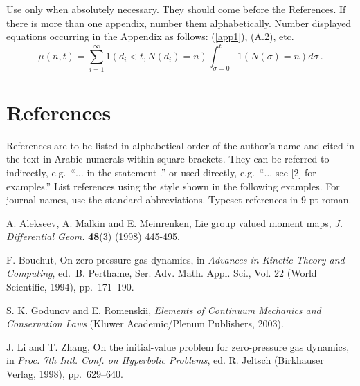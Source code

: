 \documentclass{ws-ijnt}
\begin{document}
Use only when absolutely necessary. They
should come before the References. If there is more than one 
appendix, number them alphabetically. Number displayed equations
occurring in the Appendix as follows: (\ref{app1}), (A.2),
etc.
\begin{equation}
\mu(n, t) = {\sum^\infty_{i=1} 1(d_i < t, N(d_i) 
= n)}{\int^t_{\sigma=0} 1(N(\sigma) = n)d\sigma}\,.
\label{app1}
\end{equation}

\section*{References}

References are to be listed in alphabetical order of the author's name
and cited in the text in Arabic numerals within square brackets. 
They can be referred to indirectly, 
e.g.~``$\ldots$ in the statement \cite{2}.'' or used directly,
e.g.~``$\ldots$ see [2] for examples.'' List references using the
style shown in the following examples. For journal names, use the
standard abbreviations.  Typeset references in 9 pt roman.

\begin{thebibliography}{0}

 A. Alekseev, A. Malkin and E. Meinrenken, Lie group valued
moment maps, {\it J. Differential Geom.} {\bf 48}(3) (1998) 445-495.

 F. Bouchut, On zero pressure gas dynamics, in 
{\it Advances in Kinetic Theory and Computing}, ed.~B. Perthame, 
Ser. Adv. Math. Appl. Sci., Vol. 22 (World Scientific, 1994),
pp.~171--190.

 S. K. Godunov and E. Romenskii, {\it Elements of Continuum 
Mechanics and Conservation Laws} (Kluwer Academic/Plenum Publishers,
2003).

 J. Li and T. Zhang, On the initial-value problem for
zero-pressure gas dynamics, in {\it Proc. 7th Intl. Conf. on Hyperbolic
Problems}, ed. R. Jeltsch (Birkhauser Verlag, 1998), pp.~629--640.

\end{thebibliography}
\end{document}
